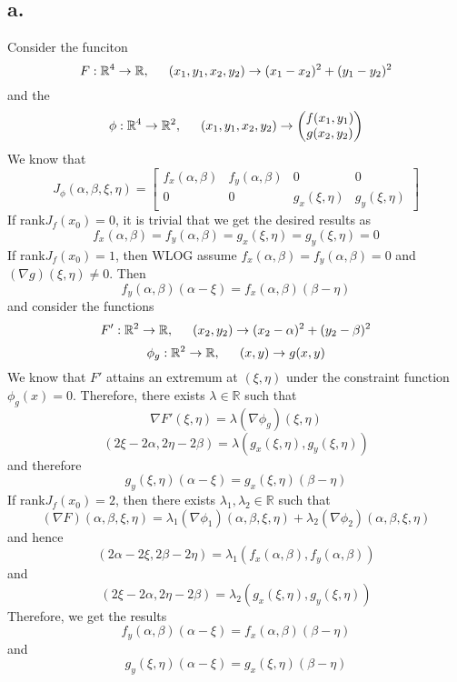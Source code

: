 \documentclass[11pt]{article}
\begin{document}
\subsection*{a.}
Consider the funciton 
\[
    F: \mathbb{R}^4 \to \mathbb{R}, \indent (x_1,y_1,x_2,y_2) \to (x_1-x_2)^2 + (y_1-y_2)^2
\]
and the
\[
    \phi: \mathbb{R}^4 \to \mathbb{R}^2, \indent (x_1,y_1,x_2,y_2) \to 
    \begin{pmatrix}
        f(x_1,y_1) \\
        g(x_2,y_2)
    \end{pmatrix}    
\]
We know that 
\[
    J_\phi(\alpha,\beta,\xi,\eta) = 
    \begin{bmatrix}
        f_{x}(\alpha,\beta) & f_{y}(\alpha,\beta) & 0 & 0 \\
        0 & 0 & g_{x}(\xi,\eta) & g_{y}(\xi,\eta)
    \end{bmatrix}    
\]
If rank$J_f(x_0) = 0$, it is trivial that we get the desired results as 
\[
    f_{x}(\alpha,\beta) = f_{y}(\alpha,\beta) = g_{x}(\xi,\eta) = g_{y}(\xi,\eta) = 0    
\]
If rank$J_f(x_0) = 1$, then WLOG assume $f_{x}(\alpha,\beta) = f_{y}(\alpha,\beta) = 0$ and 
$(\nabla g)(\xi,\eta) \ne 0$. Then 
\[
    f_y(\alpha,\beta)(\alpha-\xi) = f_x(\alpha,\beta)(\beta-\eta)
\]
and consider the functions
\[
    F': \mathbb{R}^2 \to \mathbb{R}, \indent (x_2,y_2) \to (x_2 - \alpha)^2 + (y_2- \beta)^2  
\]
\[
    \phi_g: \mathbb{R}^2 \to \mathbb{R}, \indent (x,y) \to g(x,y)
\]
We know that $F'$ attains an extremum at $(\xi,\eta)$ under the constraint function 
$\phi_g(x)=0$. Therefore, there exists $\lambda \in \mathbb{R}$ such that 
\[
    \nabla F'(\xi,\eta) = \lambda (\nabla \phi_g)(\xi,\eta)    
\]
\[
    (2\xi - 2 \alpha , 2\eta-2\beta) = \lambda (g_x(\xi,\eta), g_y(\xi,\eta))
\]
and therefore
\[
    g_y(\xi,\eta)(\alpha-\xi) = g_x(\xi,\eta)(\beta-\eta)
\]
If rank$J_f(x_0) = 2$, then there exists $\lambda_1, \lambda_2 \in \mathbb{R}$ such that 
\[
    (\nabla F)(\alpha,\beta, \xi,\eta) = \lambda_1 (\nabla \phi_1) (\alpha,\beta, \xi,\eta) + \lambda_2 (\nabla \phi_2) (\alpha,\beta, \xi,\eta)
\]
and hence
\[
    (2\alpha-2\xi, 2\beta-2\eta) = \lambda_1 (f_x(\alpha,\beta), f_y(\alpha,\beta))    
\]
and
\[
    (2\xi- 2\alpha, 2\eta-2\beta) = \lambda_2 (g_x(\xi,\eta), g_y(\xi,\eta))    
\] 
Therefore, we get the results
\[
    f_y(\alpha,\beta)(\alpha-\xi) = f_x(\alpha,\beta)(\beta-\eta)
\]
and
\[
    g_y(\xi,\eta)(\alpha-\xi) = g_x(\xi,\eta)(\beta-\eta)
\]
\end{document}

